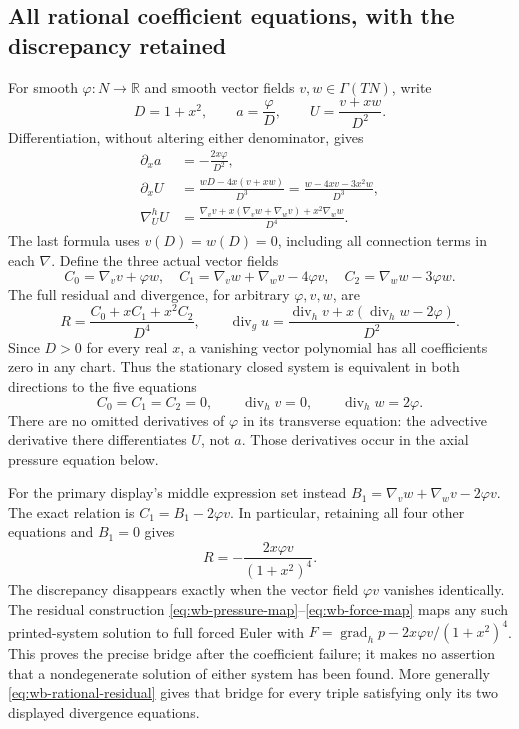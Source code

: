 \subsection{All rational coefficient equations, with the discrepancy retained}
For smooth $\varphi\colon N\to\mathbb R$ and smooth vector fields
$v,w\in\Gamma(TN)$, write
\begin{equation}\label{eq:wb-rational}
 D=1+x^2,\qquad a=\frac\varphi D,\qquad U=\frac{v+xw}{D^2}.
\end{equation}
Differentiation, without altering either denominator, gives
\begin{align}
 \partial_xa&=-\frac{2x\varphi}{D^2},\\
 \partial_xU&=\frac{wD-4x(v+xw)}{D^3}
 =\frac{w-4xv-3x^2w}{D^3},\label{eq:wb-U-derivative}\\
 \nabla^h_U U&=\frac{\nabla_vv+x(\nabla_vw+\nabla_wv)
 +x^2\nabla_ww}{D^4}.
\end{align}
The last formula uses $v(D)=w(D)=0$, including all connection terms
in each $\nabla$. Define the three actual vector fields
\begin{equation}\label{eq:wb-C}
 C_0=\nabla_vv+\varphi w,\quad
 C_1=\nabla_vw+\nabla_wv-4\varphi v,\quad
 C_2=\nabla_ww-3\varphi w.
\end{equation}
The full residual and divergence, for arbitrary $\varphi,v,w$, are
\begin{equation}\label{eq:wb-rational-residual}
 R=\frac{C_0+xC_1+x^2C_2}{D^4},\qquad
 \operatorname{div}_g u=
 \frac{\operatorname{div}_hv+x(\operatorname{div}_hw-2\varphi)}{D^2}.
\end{equation}
Since $D>0$ for every real $x$, a vanishing vector polynomial has all
coefficients zero in any chart. Thus the stationary closed system is
equivalent in both directions to the five equations
\begin{equation}\label{eq:wb-correct-five}
 C_0=C_1=C_2=0,\qquad
 \operatorname{div}_hv=0,\qquad\operatorname{div}_hw=2\varphi.
\end{equation}
There are no omitted derivatives of $\varphi$ in its transverse
equation: the advective derivative there differentiates $U$, not $a$.
Those derivatives occur in the axial pressure equation below.

For the primary display's middle expression set instead
$B_1=\nabla_vw+\nabla_wv-2\varphi v$. The exact relation is
$C_1=B_1-2\varphi v$. In particular, retaining all four other
equations and $B_1=0$ gives
\begin{equation}\label{eq:wb-blog-residual}
 R=-\frac{2x\varphi v}{(1+x^2)^4}.
\end{equation}
The discrepancy disappears exactly when the vector field
$\varphi v$ vanishes identically. The residual construction
\eqref{eq:wb-pressure-map}--\eqref{eq:wb-force-map} maps any such
printed-system solution to full forced Euler with
$F=\operatorname{grad}_h p-2x\varphi v/(1+x^2)^4$.
This proves the precise bridge after the coefficient failure; it makes
no assertion that a nondegenerate solution of either system has been found.
More generally \eqref{eq:wb-rational-residual} gives that bridge for
every triple satisfying only its two displayed divergence equations.

